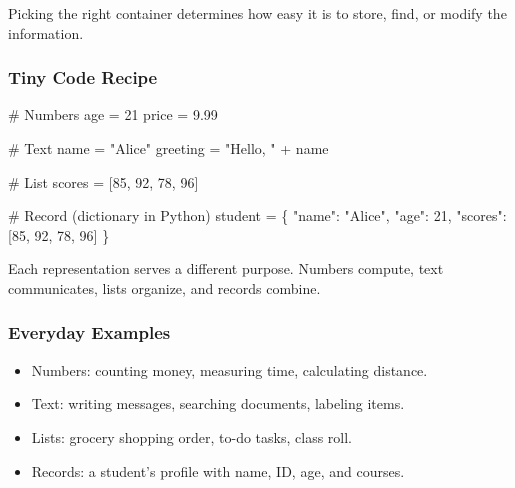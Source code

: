\documentclass[
  letterpaper,
  DIV=11,
  numbers=noendperiod]{scrreprt}
\newenvironment{Shaded}{\begin{snugshade}}{\end{snugshade}}
\newcommand{\CommentTok}[1]{\textcolor[rgb]{0.37,0.37,0.37}{#1}}
\newcommand{\DecValTok}[1]{\textcolor[rgb]{0.68,0.00,0.00}{#1}}
\newcommand{\FloatTok}[1]{\textcolor[rgb]{0.68,0.00,0.00}{#1}}
\newcommand{\NormalTok}[1]{\textcolor[rgb]{0.00,0.23,0.31}{#1}}
\newcommand{\OperatorTok}[1]{\textcolor[rgb]{0.37,0.37,0.37}{#1}}
\newcommand{\StringTok}[1]{\textcolor[rgb]{0.13,0.47,0.30}{#1}}
\providecommand{\tightlist}{%
  \setlength{\itemsep}{0pt}\setlength{\parskip}{0pt}}
\begin{document}
Picking the right container determines how easy it is to store, find, or
modify the information.

\subsubsection{Tiny Code Recipe}\label{tiny-code-recipe-5}

\begin{Shaded}
\begin{Highlighting}[]
\CommentTok{\# Numbers}
\NormalTok{age }\OperatorTok{=} \DecValTok{21}
\NormalTok{price }\OperatorTok{=} \FloatTok{9.99}

\CommentTok{\# Text}
\NormalTok{name }\OperatorTok{=} \StringTok{"Alice"}
\NormalTok{greeting }\OperatorTok{=} \StringTok{"Hello, "} \OperatorTok{+}\NormalTok{ name}

\CommentTok{\# List}
\NormalTok{scores }\OperatorTok{=}\NormalTok{ [}\DecValTok{85}\NormalTok{, }\DecValTok{92}\NormalTok{, }\DecValTok{78}\NormalTok{, }\DecValTok{96}\NormalTok{]}

\CommentTok{\# Record (dictionary in Python)}
\NormalTok{student }\OperatorTok{=}\NormalTok{ \{}
    \StringTok{"name"}\NormalTok{: }\StringTok{"Alice"}\NormalTok{,}
    \StringTok{"age"}\NormalTok{: }\DecValTok{21}\NormalTok{,}
    \StringTok{"scores"}\NormalTok{: [}\DecValTok{85}\NormalTok{, }\DecValTok{92}\NormalTok{, }\DecValTok{78}\NormalTok{, }\DecValTok{96}\NormalTok{]}
\NormalTok{\}}
\end{Highlighting}
\end{Shaded}

Each representation serves a different purpose. Numbers compute, text
communicates, lists organize, and records combine.

\subsubsection{Everyday Examples}\label{everyday-examples-4}

\begin{itemize}
\tightlist
\item
  Numbers: counting money, measuring time, calculating distance.
\item
  Text: writing messages, searching documents, labeling items.
\item
  Lists: grocery shopping order, to-do tasks, class roll.
\item
  Records: a student's profile with name, ID, age, and courses.
\end{itemize}
\end{document}

